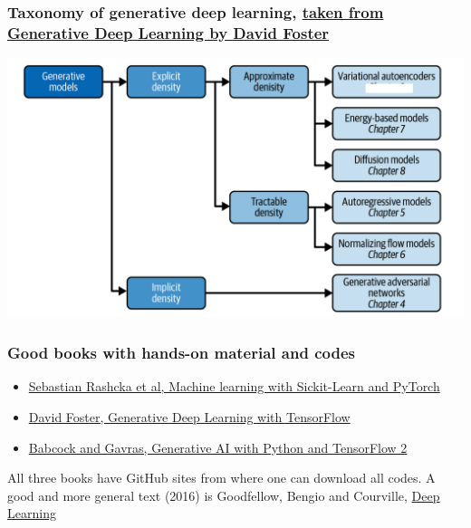 \documentclass{beamer}
\begin{document}
\begin{frame}
\frametitle{Taxonomy of generative deep learning, \href{{https://www.oreilly.com/library/view/generative-deep-learning/9781098134174/ch01.html}}{taken from Generative Deep Learning by David Foster}}

\vspace{6mm}

\centerline{\includegraphics[width=1.0\linewidth]{figures/generativemodels.png}}

\vspace{6mm}
\end{frame}

\begin{frame}
\frametitle{Good books with hands-on material and codes}

\begin{block}{}
\begin{itemize}
\item \href{{https://sebastianraschka.com/blog/2022/ml-pytorch-book.html}}{Sebastian Rashcka et al, Machine learning with Sickit-Learn and PyTorch}

\item \href{{https://www.oreilly.com/library/view/generative-deep-learning/9781098134174/ch01.html}}{David Foster, Generative Deep Learning with TensorFlow}

\item \href{{https://github.com/PacktPublishing/Hands-On-Generative-AI-with-Python-and-TensorFlow-2}}{Babcock and Gavras, Generative AI with Python and TensorFlow 2}
\end{itemize}

\noindent
\end{block}

All three books have GitHub sites from where  one can download all codes. A good and more general text (2016)
is Goodfellow, Bengio and Courville, \href{{https://www.deeplearningbook.org/}}{Deep Learning}
\end{frame}
\end{document}
